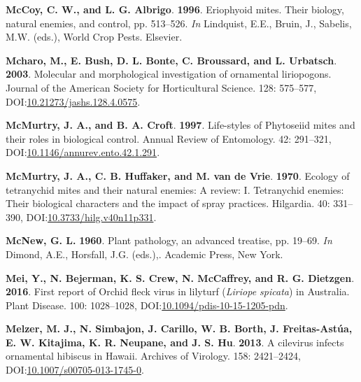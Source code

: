 \documentclass[12pt,final,CPage]{ufthesis}
\newlength{\cslhangindent}
\newenvironment{CSLReferences}[2] %
{%
	\setlength{\parindent}{0pt}
	\ifodd #1 \everypar{\setlength{\hangindent}{\cslhangindent}}\ignorespaces\fi
	\ifnum #2 > 0
	\setlength{\parskip}{#2\baselineskip}
	\fi
}%
{}
\begin{document}
{\begin{CSLReferences}{1}{0}
  \leavevmode{}%
  \textbf{McCoy, C. W., and L. G. Albrigo}. \textbf{1996}. Eriophyoid mites. Their biology, natural enemies, and control, pp. 513--526. \emph{In} Lindquist, E.E., Bruin, J., Sabelis, M.W. (eds.), World Crop Pests. Elsevier.

  \leavevmode{}%
  \textbf{Mcharo, M., E. Bush, D. L. Bonte, C. Broussard, and L. Urbatsch}. \textbf{2003}. Molecular and morphological investigation of ornamental liriopogons. Journal of the American Society for Horticultural Science. 128: 575--577, DOI:\href{https://doi.org/10.21273/jashs.128.4.0575}{10.21273/jashs.128.4.0575}.

  \leavevmode{}%
  \textbf{McMurtry, J. A., and B. A. Croft}. \textbf{1997}. Life-styles of {Phytoseiid} mites and their roles in biological control. Annual Review of Entomology. 42: 291--321, DOI:\href{https://doi.org/10.1146/annurev.ento.42.1.291}{10.1146/annurev.ento.42.1.291}.

  \leavevmode{}%
  \textbf{McMurtry, J. A., C. B. Huffaker, and M. van de Vrie}. \textbf{1970}. Ecology of tetranychid mites and their natural enemies: A review: I. Tetranychid enemies: Their biological characters and the impact of spray practices. Hilgardia. 40: 331--390, DOI:\href{https://doi.org/10.3733/hilg.v40n11p331}{10.3733/hilg.v40n11p331}.

  \leavevmode{}%
  \textbf{McNew, G. L.} \textbf{1960}. Plant pathology, an advanced treatise, pp. 19--69. \emph{In} Dimond, A.E., Horsfall, J.G. (eds.),. Academic Press, New York.

  \leavevmode{}%
  \textbf{Mei, Y., N. Bejerman, K. S. Crew, N. McCaffrey, and R. G. Dietzgen}. \textbf{2016}. First report of {Orchid fleck virus} in lilyturf {(\emph{Liriope spicata})} in {Australia}. Plant Disease. 100: 1028--1028, DOI:\href{https://doi.org/10.1094/pdis-10-15-1205-pdn}{10.1094/pdis-10-15-1205-pdn}.

  \leavevmode{}%
  \textbf{Melzer, M. J., N. Simbajon, J. Carillo, W. B. Borth, J. Freitas-Astúa, E. W. Kitajima, K. R. Neupane, and J. S. Hu}. \textbf{2013}. A cilevirus infects ornamental hibiscus in {Hawaii}. Archives of Virology. 158: 2421--2424, DOI:\href{https://doi.org/10.1007/s00705-013-1745-0}{10.1007/s00705-013-1745-0}.


\end{CSLReferences}}
\end{document}
